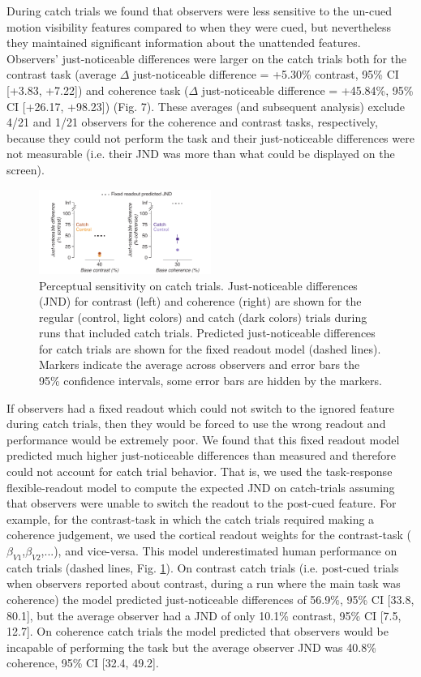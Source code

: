 During catch trials we found that observers were less sensitive to the un-cued motion visibility features compared to when they were cued, but nevertheless they maintained significant information about the unattended features. Observers’ just-noticeable differences were larger on the catch trials both for the contrast task (average $\Delta$ just-noticeable difference = +5.30\% contrast, 95\% CI [+3.83, +7.22]) and coherence task ($\Delta$ just-noticeable difference = +45.84\%, 95\% CI [+26.17, +98.23]) (Fig. 7). These averages (and subsequent analysis) exclude 4/21 and 1/21 observers for the coherence and contrast tasks, respectively, because they could not perform the task and their just-noticeable differences were not measurable (i.e. their JND was more than what could be displayed on the screen). 

\begin{figure}
\centering
\includegraphics[keepaspectratio,width=0.5\textwidth]{figs_c3/Fig8_catch.pdf}
\caption[Perceptual sensitivity on catch trials]{Perceptual sensitivity on catch trials. Just-noticeable differences (JND) for contrast (left) and coherence (right) are shown for the regular (control, light colors) and catch (dark colors) trials during runs that included catch trials. Predicted just-noticeable differences for catch trials are shown for the fixed readout model (dashed lines). Markers indicate the average across observers and error bars the 95\% confidence intervals, some error bars are hidden by the markers. }
\label{fig:c3f8}
\end{figure}

If observers had a fixed readout which could not switch to the ignored feature during catch trials, then they would be forced to use the wrong readout and performance would be extremely poor. We found that this fixed readout model predicted much higher just-noticeable differences than measured and therefore could not account for catch trial behavior. That is, we used the task-response flexible-readout model to compute the expected JND on catch-trials assuming that observers were unable to switch the readout to the post-cued feature. For example, for the contrast-task in which the catch trials required making a coherence judgement, we used the cortical readout weights for the contrast-task ($\beta_{V1}$,$\beta_{V2}$,...), and vice-versa. This model underestimated human performance on catch trials (dashed lines, Fig. \ref{fig:c3f8}). On contrast catch trials (i.e. post-cued trials when observers reported about contrast, during a run where the main task was coherence) the model predicted just-noticeable differences of 56.9\%, 95\% CI [33.8, 80.1], but the average observer had a JND of only 10.1\% contrast, 95\% CI [7.5, 12.7]. On coherence catch trials the model predicted that observers would be incapable of performing the task but the average observer JND was 40.8\% coherence, 95\% CI [32.4, 49.2]. 

